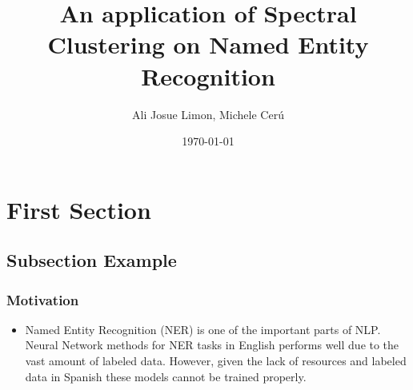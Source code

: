 \documentclass{beamer}
\title[spectral clustering for NER ]{An application of Spectral Clustering on Named Entity Recognition } %
\author{Ali Josue Limon, Michele Cer\'u} %
\institute[UCLA] %
{
New York University \\ %
\medskip
\textit{ajl649@nyu.edu; mc3784@nyu.edu} %
}
\date{\today} %
\begin{document}
\begin{frame}
\titlepage %
\end{frame}





\section{First Section} %

\subsection{Subsection Example} %

\begin{frame}
	\frametitle{Motivation}
	\begin{itemize} 
		\item Named Entity Recognition (NER) is one of the important parts of NLP. Neural Network methods for NER tasks in English performs well due to the vast amount of labeled data. However, given the lack of resources and labeled data in Spanish these models cannot be trained properly. 
		
		
	\end{itemize}
\end{frame}
\end{document}
